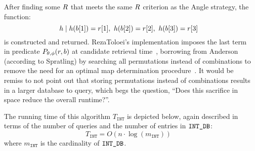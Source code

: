 After finding some $R$ that meets the same $R$ criterion as the Angle strategy, the function:
\begin{equation}
    h \mid h(\imagesubset[1]) = \candidateset[1], \ h(\imagesubset[2]) = \candidateset[2], \ h(\imagesubset[3]) = \candidateset[3]
\end{equation}
is constructed and returned.
RezaToloei's implementation imposes the last term in predicate $P_{\theta, \phi}(r, b)$ at candidate retrieval time~\cite{toloei:compositeIdentification}, borrowing from Anderson (according to Spratling) by searching all permutations instead of combinations to remove the need for an optimal map determination procedure~\cite{anderson:autonomousStarSensing}.
It would be remiss to not point out that storing permutations instead of combinations results in a larger database to query, which begs the question, ``Does this sacrifice in space reduce the overall runtime?''.

%

The running time of this algorithm $T_\texttt{INT}$ is depicted below, again described in terms of the number of queries and the number of entries in $\texttt{INT\_DB}$:
\begin{equation}\label{eq:dotComplexity}
    T_\texttt{INT} = O\left( n \cdot \log(m_\texttt{INT}) \right)
\end{equation}
where $m_\texttt{INT}$ is the cardinality of $\texttt{INT\_DB}$.

